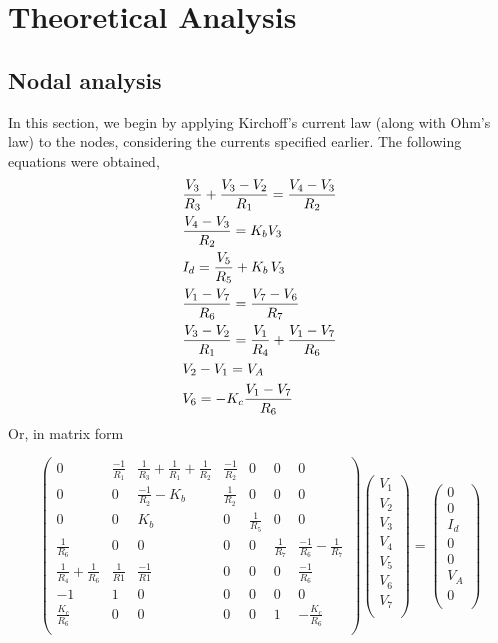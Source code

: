 \section{Theoretical Analysis}
\label{sec:analysis}
\subsection{Nodal analysis}
In this section, we begin by applying Kirchoff's current law (along with Ohm's law) to the nodes, considering the currents specified earlier. The following equations were obtained,
\begin{align}
\centering
    &\frac{V_3}{R_3} + \frac{V_3 - V_2}{R_1} = \frac{V_4 - V_3}{R_2}\\
    &\frac{V_4 - V_3}{R_2} = K_bV_3\\
    &I_d = \frac{V_5}{R_5} + K_b\,V_3\\
    &\frac{V_1-V_7}{R_6}=\frac{V_7-V_6}{R_7}\\
    &\frac{V_3-V_2}{R_1} = \frac{V_1}{R_4} + \frac{V_1 - V_7}{R_6}\\
    &V_2-V_1=V_A\\
    &V_6 = -K_c\frac{V_1-V_7}{R_6}
    \label{eq:KCL}
\end{align}
Or, in matrix form

\begin{equation}
\begin{pmatrix}
0& \frac{-1}{R_1} & \frac{1}{R_3} +\frac{1}{R_1} + \frac{1}{R_2} & \frac{-1}{R_2} & 0 & 0 & 0\\
0& 0 & \frac{-1}{R_2} - K_b & \frac{1}{R_2} & 0 & 0 & 0\\
0& 0 & K_b & 0 & \frac{1}{R_5} & 0 & 0\\
\frac{1}{R_6} & 0 & 0 & 0 & 0 & \frac{1}{R_7} & \frac{-1}{R_6} - \frac{1}{R_7}\\
\frac{1}{R_4} + \frac{1}{R_6}& \frac{1}{R1} & \frac{-1}{R1} & 0 & 0 & 0 &\frac{-1}{R_6}\\
-1 & 1 & 0 & 0 & 0 & 0 & 0\\
\frac{K_c}{R_6} & 0 & 0 & 0 & 0 & 1 & -\frac{K_c}{R_6}\\
\end{pmatrix}
\begin{pmatrix}
V_1\\
V_2\\
V_3\\
V_4\\
V_5\\
V_6\\
V_7\\
\end{pmatrix}
=
\begin{pmatrix}
0\\
0\\
I_d\\
0\\
0\\
V_A\\
0\\
\end{pmatrix}
\label{eq:MatrixKCL}
\end{equation}

